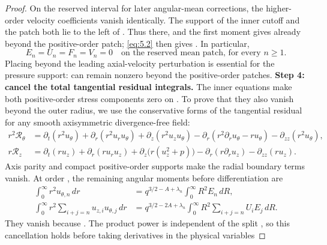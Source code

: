 \begin{proof}
On the reserved interval  for later angular-mean corrections, the higher-order
velocity coefficients vanish identically. The support of the inner cutoff and the patch
 both lie to the left of . Thus
 there, and the first moment gives  already beyond the
positive-order patch; \eqref{eq:5.2} then gives . In particular,
\begin{equation}\label{eq:5.18}
E_n=U_n=F_n=V_n=0
\quad\text{on the reserved mean patch, for every }n\geq1.
\tag{5.18}
\end{equation}
Placing  beyond the leading axial-velocity perturbation is essential for the pressure support:
 can remain nonzero beyond the positive-order patches.
%
\textbf{Step 4: cancel the total tangential residual integrals.}
The inner equations make both positive-order stress components zero on
. To prove that they also vanish beyond the outer radius, we use the conservative forms of the
tangential residual for any smooth axisymmetric divergence-free field:
\[
\begin{aligned}
r^2\mathscr R_\theta
&=\partial_t(r^2u_\theta)
  +\partial_r(r^2u_ru_\theta)
  +\partial_z(r^2u_zu_\theta)
  -\partial_r(r^2\partial_ru_\theta-ru_\theta)
  -\partial_{zz}(r^2u_\theta),\\
r\mathscr R_z
&=\partial_t(ru_z)
  +\partial_r(ru_ru_z)
  +\partial_z\bigl(r(u_z^2+p)\bigr)
  -\partial_r(r\partial_ru_z)
  -\partial_{zz}(ru_z).
\end{aligned}
\]
Axis parity and compact positive-order supports make the radial boundary terms vanish. At order
, the remaining angular moments before differentiation are
\[
\begin{aligned}
\int_0^\infty r^2u_{\theta,n}\,dr
&=q^{3/2-A+\lambda_n}\int_0^\infty R^2E_n\,dR,\\
\int_0^\infty r^2\sum_{i+j=n}u_{z,i}u_{\theta,j}\,dr
&=q^{3/2-2A+\lambda_n}\int_0^\infty R^2\sum_{i+j=n}U_iE_j\,dR.
\end{aligned}
\]
They vanish because . The product power is independent of the split
, so this cancellation holds before taking derivatives in the physical variables

\end{proof}
